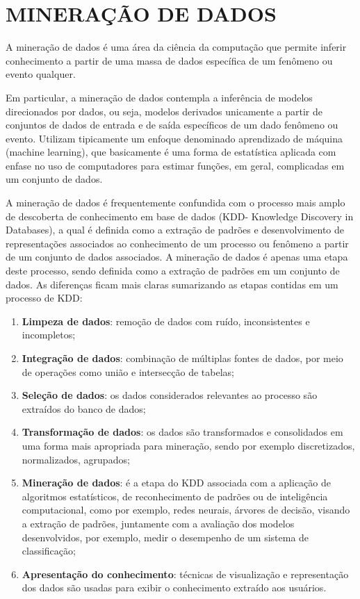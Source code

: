 \chapter{MINERAÇÃO DE DADOS}

A mineração de dados é uma área da ciência da computação que permite inferir conhecimento a partir de uma massa de dados específica de um fenômeno ou evento qualquer.

Em particular, a mineração de dados contempla a inferência de modelos direcionados por dados, ou seja, modelos derivados unicamente a partir de conjuntos de dados de entrada e de saída específicos de um dado fenômeno ou evento. Utilizam tipicamente um enfoque denominado aprendizado de máquina (machine learning), que basicamente é uma forma de estatística aplicada com enfase no uso de computadores para estimar funções, em geral, complicadas em um conjunto de dados.

A mineração de dados é frequentemente confundida com o processo mais amplo de descoberta de conhecimento em base de dados (KDD- Knowledge Discovery in Databases), a qual é definida como a extração de padrões e desenvolvimento de representações associados ao conhecimento de um processo ou fenômeno a partir de um conjunto de dados associados. A mineração de dados é apenas uma etapa deste processo, sendo definida como a extração de padrões em um conjunto de dados. As diferenças ficam mais claras sumarizando as etapas contidas em um processo de KDD:

\begin{enumerate}
\item {\bf Limpeza de dados}: remoção de dados com ruído, inconsistentes e incompletos;
\item {\bf Integração de dados}: combinação de múltiplas fontes de dados, por meio de operações como união e intersecção de tabelas;
\item {\bf Seleção de dados}: os dados considerados relevantes ao processo são extraídos do banco de dados;
\item {\bf Transformação de dados}: os dados são transformados e consolidados em uma forma mais apropriada para mineração, sendo por exemplo discretizados, normalizados, agrupados;
\item {\bf Mineração de dados}: é a etapa do KDD associada com a aplicação de algoritmos estatísticos, de reconhecimento de padrões ou de inteligência computacional, como por exemplo, redes neurais, árvores de decisão, visando a extração de padrões, juntamente com a avaliação dos modelos desenvolvidos, por exemplo, medir o desempenho de um sistema de classificação;
\item {\bf Apresentação do conhecimento}: técnicas de visualização e representação dos dados são usadas para exibir o conhecimento extraído aos usuários.
\end{enumerate} 

